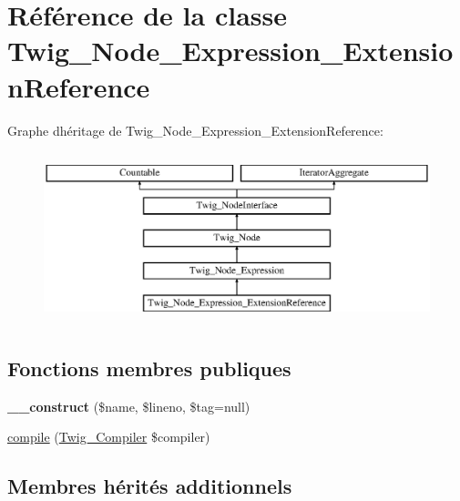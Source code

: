 \hypertarget{class_twig___node___expression___extension_reference}{}\section{Référence de la classe Twig\+\_\+\+Node\+\_\+\+Expression\+\_\+\+Extension\+Reference}
\label{class_twig___node___expression___extension_reference}
Graphe d\textquotesingle{}héritage de Twig\+\_\+\+Node\+\_\+\+Expression\+\_\+\+Extension\+Reference\+:\begin{figure}[H]
\begin{center}
\leavevmode
\includegraphics[height=5.000000cm]{class_twig___node___expression___extension_reference}
\end{center}
\end{figure}
\subsection*{Fonctions membres publiques}
\begin{DoxyCompactItemize}
\item 
{\bfseries \+\_\+\+\_\+construct} (\$name, \$lineno, \$tag=null)\hypertarget{class_twig___node___expression___extension_reference_a0028166bd229cdc2e0c0a79c4f3069fa}{}\label{class_twig___node___expression___extension_reference_a0028166bd229cdc2e0c0a79c4f3069fa}

\item 
\hyperlink{class_twig___node___expression___extension_reference_a4e0faa87c3fae583620b84d3607085da}{compile} (\hyperlink{class_twig___compiler}{Twig\+\_\+\+Compiler} \$compiler)
\end{DoxyCompactItemize}
\subsection*{Membres hérités additionnels}


